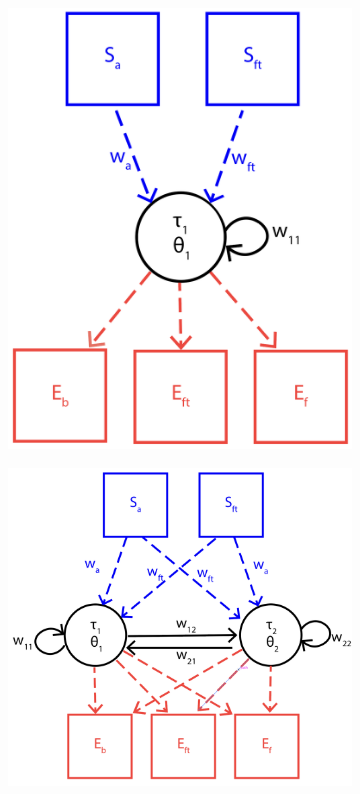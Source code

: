\documentclass{article}
\begin{document}
\begin{figure}[htbp]
\begin{subfigure}[b]{0.29\textwidth}
    \includegraphics[width=\textwidth]{../plots/network1N.png}
    \caption{}
    \label{fig:N1Plot}
  \end{subfigure}%
  \begin{subfigure}[b]{0.41\textwidth}
    \vspace{0pt} %
    \centering
    \includegraphics[width=\textwidth]{../plots/network2N.png}

\end{subfigure}
\end{figure}
\end{document}
